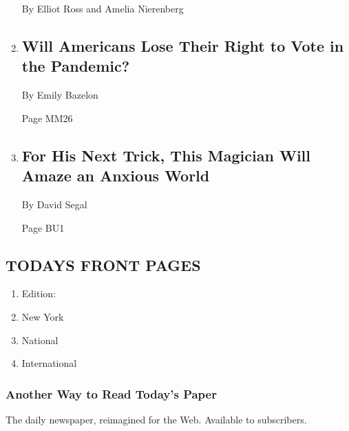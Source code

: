 \begin{enumerate}
  By Elliot Ross and Amelia Nierenberg
\item
  \href{/2020/05/05/magazine/voting-by-mail-2020-covid.html}{}

  \hypertarget{will-americans-lose-their-right-to-vote-in-the-pandemic}{%
  \subsection{Will Americans Lose Their Right to Vote in the
  Pandemic?}\label{will-americans-lose-their-right-to-vote-in-the-pandemic}}

  By Emily Bazelon

  Page MM26
\item
  \href{/2020/05/05/business/karan-singh-magic.html}{}

  \hypertarget{for-his-next-trick-this-magician-will-amaze-an-anxious-world}{%
  \subsection{For His Next Trick, This Magician Will Amaze an Anxious
  World}\label{for-his-next-trick-this-magician-will-amaze-an-anxious-world}}

  By David Segal

  Page BU1
\end{enumerate}

\hypertarget{todays-front-pages}{%
\subsection{TODAYS FRONT PAGES}\label{todays-front-pages}}

\begin{enumerate}
\def\labelenumi{\arabic{enumi}.}
\tightlist
\item
  Edition:
\item
  New York
\item
  National
\item
  International
\end{enumerate}

\href{http://app.nytimes3xbfgragh.onion/todayspaper}{}

\hypertarget{another-way-to-read-todays-paper}{%
\subsubsection{Another Way to Read Today's
Paper}\label{another-way-to-read-todays-paper}}

The daily newspaper, reimagined for the Web. Available to subscribers.

